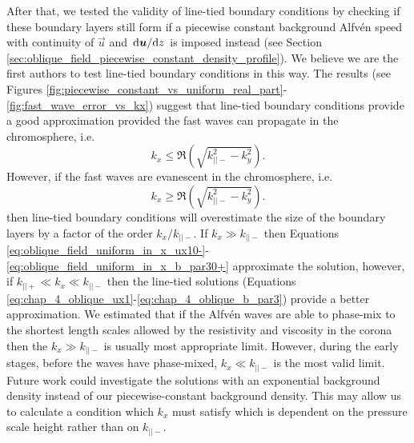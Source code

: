After that, we tested the validity of line-tied boundary conditions by checking if these boundary layers still form if a piecewise constant background Alfv\'en speed with continuity of $\vec{u}$ and $\dv*{\boldsymbol{u}}{z}$ is imposed instead (see Section \ref{sec:oblique_field_piecewise_constant_density_profile}). We believe we are the first authors to test line-tied boundary conditions in this way. The results (see Figures \ref{fig:piecewise_constant_vs_uniform_real_part}-\ref{fig:fast_wave_error_vs_kx}) suggest that line-tied boundary conditions provide a good approximation provided the fast waves can propagate in the chromosphere, i.e.
\[k_x \le \Re(\sqrt{k_{||-}^2 - k_y^2}).\]
However, if the fast waves are evanescent in the chromosphere, i.e. 
\[k_x \ge \Re(\sqrt{k_{||-}^2 - k_y^2}).\]
then line-tied boundary conditions will overestimate the size of the boundary layers by a factor of the order $k_x/k_{||-}$. If $k_x\gg k_{||-}$ then Equations \eqref{eq:oblique_field_uniform_in_x_ux10-}-\eqref{eq:oblique_field_uniform_in_x_b_par30+} approximate the solution, however, if $k_{||+} \ll k_x\ll k_{||-}$ then the line-tied solutions (Equations \ref{eq:chap_4_oblique_ux1}-\ref{eq:chap_4_oblique_b_par3}) provide a better approximation. We estimated that if the Alfv\'en waves are able to phase-mix to the shortest length scales allowed by the resistivity and viscosity in the corona then the $k_x\gg k_{||-}$ is usually most appropriate limit. However, during the early stages, before the waves have phase-mixed, $k_x\ll k_{||-}$ is the most valid limit. Future work could investigate the solutions with an exponential background density instead of our piecewise-constant background density. This may allow us to calculate a condition which $k_x$ must satisfy which is dependent on the pressure scale height rather than on $k_{||-}$.

